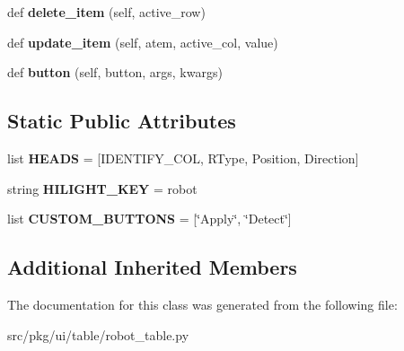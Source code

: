 \begin{DoxyCompactItemize}
def {\bfseries delete\+\_\+item} (self, active\+\_\+row)
\item 
\mbox{\label{classrnb-planning_1_1src_1_1pkg_1_1ui_1_1table_1_1robot__table_1_1_robot_table_a1e381839202f3dd8744d88d9083335be}} 
def {\bfseries update\+\_\+item} (self, atem, active\+\_\+col, value)
\item 
\mbox{\label{classrnb-planning_1_1src_1_1pkg_1_1ui_1_1table_1_1robot__table_1_1_robot_table_a9f5ec510d5138ba10957ae00a46b720a}} 
def {\bfseries button} (self, button, args, kwargs)
\end{DoxyCompactItemize}
\subsection*{Static Public Attributes}
\begin{DoxyCompactItemize}
\item 
\mbox{\label{classrnb-planning_1_1src_1_1pkg_1_1ui_1_1table_1_1robot__table_1_1_robot_table_a38aa876ac734c98ccf7aa1b6e341a8c0}} 
list {\bfseries H\+E\+A\+DS} = \mbox{[}I\+D\+E\+N\+T\+I\+F\+Y\+\_\+\+C\+OL, \textquotesingle{}R\+Type\textquotesingle{}, \textquotesingle{}Position\textquotesingle{}, \textquotesingle{}Direction\textquotesingle{}\mbox{]}
\item 
\mbox{\label{classrnb-planning_1_1src_1_1pkg_1_1ui_1_1table_1_1robot__table_1_1_robot_table_ac0faf55bbbfc2225b67c9873817f992f}} 
string {\bfseries H\+I\+L\+I\+G\+H\+T\+\_\+\+K\+EY} = \textquotesingle{}robot\textquotesingle{}
\item 
\mbox{\label{classrnb-planning_1_1src_1_1pkg_1_1ui_1_1table_1_1robot__table_1_1_robot_table_aaaf6274a2b5a8db1438426069d25f9bf}} 
list {\bfseries C\+U\+S\+T\+O\+M\+\_\+\+B\+U\+T\+T\+O\+NS} = \mbox{[}\char`\"{}Apply\char`\"{}, \char`\"{}Detect\char`\"{}\mbox{]}
\end{DoxyCompactItemize}
\subsection*{Additional Inherited Members}


The documentation for this class was generated from the following file\+:\begin{DoxyCompactItemize}
\item 
src/pkg/ui/table/robot\+\_\+table.\+py\end{DoxyCompactItemize}
